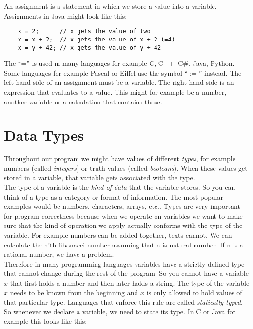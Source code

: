 \documentclass{scrreprt}
\begin{document}
An assignment is a statement in which we store a value into a variable. Assignments in Java might look like this: \\
\lstset{language=Java}
\begin{lstlisting}
	x = 2;		// x gets the value of two
	x = x + 2;	// x gets the value of x + 2 (=4)
	x = y + 42;	// x gets the value of y + 42
\end{lstlisting}

The ``='' is used in many languages for example C, C++, C\#, Java, Python. Some languages for example Pascal or Eiffel use the symbol ``$:=$'' instead.
The left hand side of an assignment must be a variable. The right hand side is an expression that evaluates to a value. This might for example be a number, another variable or a calculation that contains those. \\

\section{Data Types}
Throughout our program we might have values of different \textit{types}, for example numbers (called \textit{integers}) or truth values (called \textit{booleans}). When these values get stored in a variable, that variable gets associated with the type. \\
The type of a variable is the \textit{kind of data} that the variable stores. So you can think of a type as a category or format of information. The most popular examples would be numbers, characters, arrays, etc.. Types are very important for program correctness because when we operate on variables we want to make sure that the kind of operation we apply actually conforms with the type of the variable. For example numbers can be added together, texts cannot. We can calculate the n'th fibonacci number assuming that n is natural number. If n is a rational number, we have a problem. \\
Therefore in many programming languages variables have a strictly defined type that cannot change during the rest of the program. So you cannot have a variable $x$ that first holds a number and then later holds a string. The type of the variable $x$ needs to be known from the beginning and $x$ is only allowed to hold values of that particular type. Languages that enforce this rule are called \textit{statically typed}. \\

So whenever we declare a variable, we need to state its type. In C or Java for example this looks like this:
\end{document}
